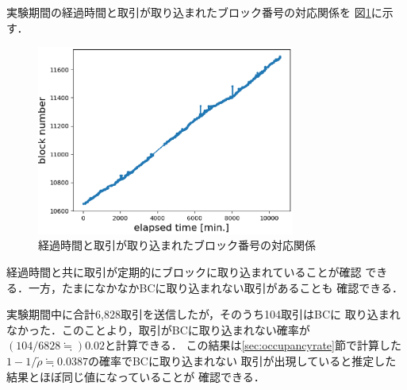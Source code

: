 \documentclass[graybox]{svmult}
\begin{document}
実験期間の経過時間と取引が取り込まれたブロック番号の対応関係を
図\ref{fig:exp3-1}に示す．
%
\begin{figure}[tb]
  \begin{center}
    \includegraphics[width=85mm]{exp3-1.eps}
  \end{center}
  \caption{経過時間と取引が取り込まれたブロック番号の対応関係}
  \label{fig:exp3-1}
\end{figure}
%
経過時間と共に取引が定期的にブロックに取り込まれていることが確認
できる．一方，たまになかなかBCに取り込まれない取引があることも
確認できる．

実験期間中に合計6,828取引を送信したが，そのうち104取引はBCに
取り込まれなかった．このことより，取引がBCに取り込まれない確率が
$(104/6828 \fallingdotseq) 0.02$と計算できる．
この結果は\ref{sec:occupancyrate}節で計算した
$1-1/\tilde{\rho} \fallingdotseq 0.0387$の確率でBCに取り込まれない
取引が出現していると推定した結果とほぼ同じ値になっていることが
確認できる．
\end{document}
